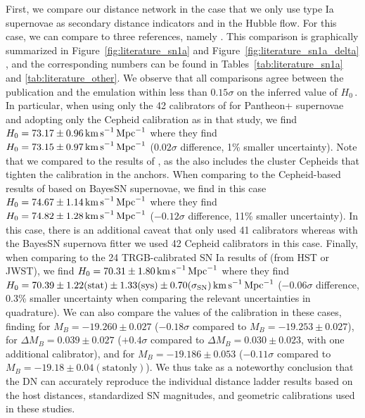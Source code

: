 First, we compare our distance network in the case that we only use type Ia supernovae as secondary distance indicators and in the Hubble flow. For this case, we can compare to three references, namely \cite{2022ApJ...934L...7R,2023MNRAS.524..235D,2025ApJ...985..203F}. This comparison is graphically summarized in Figure~\ref{fig:literature_sn1a} and Figure~\ref{fig:literature_sn1a_delta} , and the corresponding numbers can be found in Tables~\ref{tab:literature_sn1a} and \ref{tab:literature_other}. We observe that all comparisons agree between the publication and the \DN{} emulation within less than $0.15\sigma$ on the inferred value of $H_0$\,. In particular, when using only the 42 calibrators of \cite{2022ApJ...934L...7R} for Pantheon+ supernovae and adopting only the Cepheid calibration as in that study, we find $H_0 = 73.17 \pm 0.96 \,{\rm km\,s}^{-1}{\rm\,Mpc}^{-1}$ where they find $H_0=73.15 \pm 0.97\,{\rm km\,s}^{-1}{\rm\,Mpc}^{-1}$ ($0.02\sigma$ difference, 1\% smaller uncertainty). Note that we compared to the results of \cite{2022ApJ...938...36R}, as the {\DN} also includes the cluster Cepheids that tighten the calibration in the anchors. When comparing to the Cepheid-based results of \cite{2023MNRAS.524..235D} based on BayesSN supernovae, we find in this case $H_0 = 74.67 \pm 1.14 \,{\rm km\,s}^{-1}{\rm\,Mpc}^{-1}$ where they find $H_0 = 74.82 \pm 1.28 \,{\rm km\,s}^{-1}{\rm\,Mpc}^{-1}$ ($-0.12\sigma$ difference, 11\% smaller uncertainty). In this case, there is an additional caveat that \cite{2023MNRAS.524..235D} only used 41 calibrators whereas with the BayesSN supernova fitter we used 42 Cepheid calibrators in this case. Finally, when comparing to the 24 TRGB-calibrated SN Ia results of \cite{2025ApJ...985..203F} (from HST or JWST), we find $H_0 = 70.31 \pm 1.80 \,{\rm km\,s}^{-1}{\rm\,Mpc}^{-1}$ where they find $H_0 = 70.39 \pm 1.22 \mathrm{(stat)} \pm 1.33 \mathrm{(sys)} \pm 0.70 \mathrm{(\sigma_\mathrm{SN})} \,{\rm km\,s}^{-1}{\rm\,Mpc}^{-1}$ ($-0.06\sigma$ difference, 0.3\% smaller uncertainty when comparing the relevant uncertainties in quadrature). We can also compare the values of the calibration in these cases, finding for \cite{2022ApJ...934L...7R} $M_B = -19.260 \pm 0.027$ ($-0.18\sigma$ compared to $M_B = -19.253 \pm 0.027$), for \cite{2023MNRAS.524..235D} $\Delta M_B = 0.039 \pm 0.027$ ($+0.4\sigma$ compared to $\Delta M_B = 0.030 \pm 0.023$, with one additional calibrator), and for \cite{2025ApJ...985..203F} $M_B = -19.186 \pm  0.053$ ($-0.11\sigma$ compared to $M_B = -19.18 \pm 0.04 \mathrm{(stat only)}$).  We thus take as a noteworthy conclusion that the DN can accurately reproduce the individual distance ladder results based on the host distances, standardized SN magnitudes, and geometric calibrations used in these studies.  

